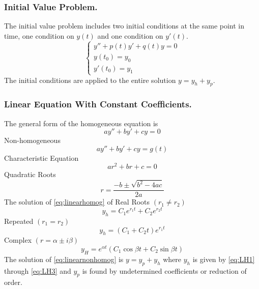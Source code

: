 \documentclass[../../main.tex]{subfiles}
\begin{document}
\subsubsection{Initial Value Problem.} The initial value problem includes two initial conditions at the same point in time, one condition on $y(t)$ and one condition on $y'(t)$. 
\begin{equation*}
\left\{
\begin{array}{l}
y''+p(t)y'+q(t)y=0\\ y(t_0)=y_0 \\ y'(t_0)=y_1
\end{array} 
\right.
\end{equation*}
The initial conditions are applied to the entire solution $y=y_h+y_p$. 

\subsubsection{Linear Equation With Constant Coefficients.} The general form of the homogeneous equation is  
\begin{equation}
ay'' + by' + cy=0 \label{eq:linearhomog}
\end{equation}
Non-homogeneous
\begin{equation}
ay''+by'+cy = g(t)\label{eq:linearnonhomog}
\end{equation}
Characteristic Equation
\begin{equation*}
ar^2 + br + c=0
\end{equation*}
Quadratic Roots
\begin{equation}
r=\frac{-b\pm\sqrt{b^2-4ac}}{2a}
\end{equation}
The solution of \eqref{eq:linearhomog} of Real Roots $(r_1 \neq r_2)$
\begin{equation}
y_h = C_1 e^{r_1 t} + C_2 e^{r_2t} \label{eq:LH1}
\end{equation}
Repeated $(r_1 = r_2)$
\begin{equation}
y_h = (C_1 + C_2 t)e^{r_1t}\label{eq:LH2}
\end{equation}
Complex $(r=\alpha\pm i\beta)$
\begin{equation}
y_H=e^{\alpha t}(C_1 \cos \beta t + C_2 \sin \beta t) \label{eq:LH3}
\end{equation}
The solution of \eqref{eq:linearnonhomog} is $y=y_p+y_h$ where $y_h$ is given by \eqref{eq:LH1} through \eqref{eq:LH3} and $y_p$ is found by undetermined coefficients or reduction of order.
\end{document}
